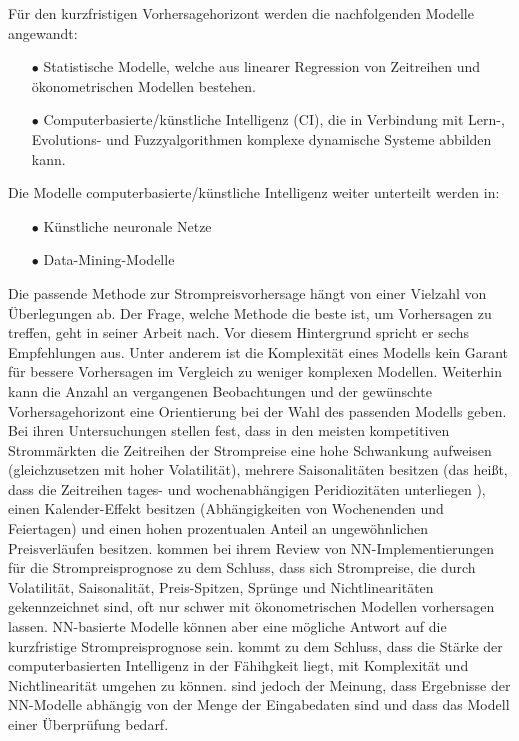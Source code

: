 Für den kurzfristigen Vorhersagehorizont werden die nachfolgenden Modelle angewandt:
\begin{itemize}
\item[\textbf{$\bullet$}]%
Statistische Modelle, welche aus linearer Regression von Zeitreihen und ökonometrischen Modellen bestehen.

\item[\textbf{$\bullet$}]%
Computerbasierte/künstliche Intelligenz (CI), die in Verbindung mit Lern-, Evolutions- und Fuzzyalgorithmen komplexe dynamische Systeme abbilden kann.
\end{itemize}

Die Modelle computerbasierte/künstliche Intelligenz weiter unterteilt werden in: 
\begin{itemize}
\item[\textbf{$\bullet$}]%
Künstliche neuronale Netze

\item[\textbf{$\bullet$}]%
Data-Mining-Modelle
\end{itemize}


Die passende Methode zur Strompreisvorhersage hängt von einer Vielzahl von Überlegungen ab. Der Frage, welche Methode die beste ist, um Vorhersagen zu treffen, geht \citet{Chatfield1988} in seiner Arbeit nach. Vor diesem Hintergrund spricht er sechs Empfehlungen aus. Unter anderem ist die Komplexität eines Modells kein Garant für bessere Vorhersagen im Vergleich zu weniger komplexen Modellen. Weiterhin kann die Anzahl an vergangenen Beobachtungen und der gewünschte Vorhersagehorizont eine Orientierung bei der Wahl des passenden Modells geben.
Bei ihren Untersuchungen stellen \citet{Nogales2002} fest, dass in den meisten kompetitiven Strommärkten die Zeitreihen der Strompreise eine hohe Schwankung aufweisen (gleichzusetzen mit hoher Volatilität), mehrere Saisonalitäten besitzen (das heißt, dass die Zeitreihen tages- und wochenabhängigen Peridiozitäten unterliegen ), einen Kalender-Effekt besitzen (Abhängigkeiten von Wochenenden und Feiertagen) und einen hohen prozentualen Anteil an ungewöhnlichen Preisverläufen besitzen. \citet{Vijayalakshmi2015} kommen bei ihrem Review von NN-Implementierungen für die Strompreisprognose zu dem Schluss, dass sich Strompreise, die durch Volatilität, Saisonalität, Preis-Spitzen, Sprünge und Nichtlinearitäten gekennzeichnet sind, oft nur schwer mit ökonometrischen Modellen vorhersagen lassen. NN-basierte Modelle können aber eine mögliche Antwort auf die kurzfristige Strompreisprognose sein. \citet{Weron2014} kommt zu dem Schluss, dass die Stärke der computerbasierten Intelligenz in der Fähihgkeit liegt, mit Komplexität und Nichtlinearität umgehen zu können. \citet{Gareta2006} sind jedoch der Meinung, dass Ergebnisse der NN-Modelle abhängig von der Menge der Eingabedaten sind und dass das Modell einer Überprüfung bedarf.

